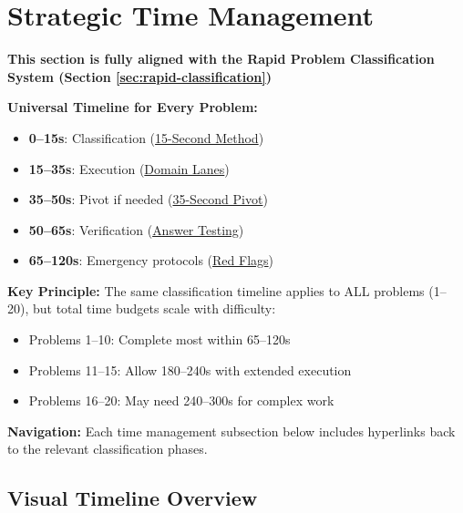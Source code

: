 \documentclass{article}
\begin{document}
\fi
\newpage

\section{Strategic Time Management}

\begin{tcolorbox}[colback=yellow!10!white,colframe=orange!75!black,title={\textbf{Integration with Rapid Classification System}}]
\textbf{This section is fully aligned with the Rapid Problem Classification System (Section \ref{sec:rapid-classification})}

\textbf{Universal Timeline for Every Problem:}
\begin{itemize}[nosep]
\item \textbf{0--15s}: Classification (\hyperlink{classify-15}{15-Second Method})
\item \textbf{15--35s}: Execution (\hyperlink{domain-lanes}{Domain Lanes})
\item \textbf{35--50s}: Pivot if needed (\hyperlink{pivot35}{35-Second Pivot})
\item \textbf{50--65s}: Verification (\hyperlink{answer-test-50}{Answer Testing})
\item \textbf{65--120s}: Emergency protocols (\hyperlink{redflags}{Red Flags})
\end{itemize}

\textbf{Key Principle:} The same classification timeline applies to ALL problems (1--20), but total time budgets scale with difficulty:
\begin{itemize}[nosep]
\item Problems 1--10: Complete most within 65--120s
\item Problems 11--15: Allow 180--240s with extended execution
\item Problems 16--20: May need 240--300s for complex work
\end{itemize}

\textbf{Navigation:} Each time management subsection below includes hyperlinks back to the relevant classification phases.
\end{tcolorbox}

\subsection{Visual Timeline Overview}
\end{document}
